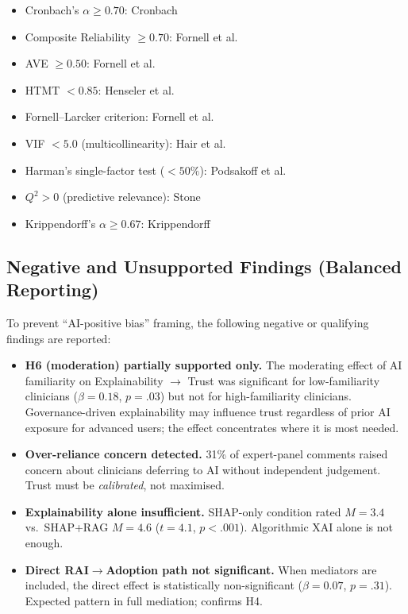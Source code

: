 \begin{itemize}[leftmargin=*, itemsep=2pt]
    \item Cronbach's $\alpha \geq 0.70$: Cronbach~\cite{cronbach1951alpha,nunnally1994psychometric}
    \item Composite Reliability $\geq 0.70$: Fornell et al.~\cite{fornell1981evaluating}
    \item AVE $\geq 0.50$: Fornell et al.~\cite{fornell1981evaluating}
    \item HTMT $< 0.85$: Henseler et al.~\cite{henseler2015criterion}
    \item Fornell--Larcker criterion: Fornell et al.~\cite{fornell1981evaluating}
    \item VIF $< 5.0$ (multicollinearity): Hair et al.~\cite{hair2019multivariate}
    \item Harman's single-factor test ($<50\%$): Podsakoff et al.~\cite{podsakoff2003common}
    \item $Q^2 > 0$ (predictive relevance): Stone~\cite{stone1974cross}
    \item Krippendorff's $\alpha \geq 0.67$: Krippendorff~\cite{krippendorff2011computing}
\end{itemize}

\subsection*{Negative and Unsupported Findings (Balanced Reporting)}
\label{sec:appd_negative_findings}

\noindent To prevent ``AI-positive bias'' framing, the following negative or qualifying findings are reported:

\begin{itemize}[leftmargin=*, itemsep=3pt]
    \item \textbf{H6 (moderation) partially supported only.} The moderating effect of AI familiarity on Explainability $\to$ Trust was significant for low-familiarity clinicians ($\beta=0.18$, $p=.03$) but not for high-familiarity clinicians. Governance-driven explainability may influence trust regardless of prior AI exposure for advanced users; the effect concentrates where it is most needed.
    \item \textbf{Over-reliance concern detected.} 31\% of expert-panel comments raised concern about clinicians deferring to AI without independent judgement. Trust must be \emph{calibrated}, not maximised.
    \item \textbf{Explainability alone insufficient.} SHAP-only condition rated $M=3.4$ vs.\ SHAP+RAG $M=4.6$ ($t=4.1$, $p<.001$). Algorithmic XAI alone is not enough.
    \item \textbf{Direct RAI$\to$Adoption path not significant.} When mediators are included, the direct effect is statistically non-significant ($\beta=0.07$, $p=.31$). Expected pattern in full mediation; confirms H4.
\end{itemize}

